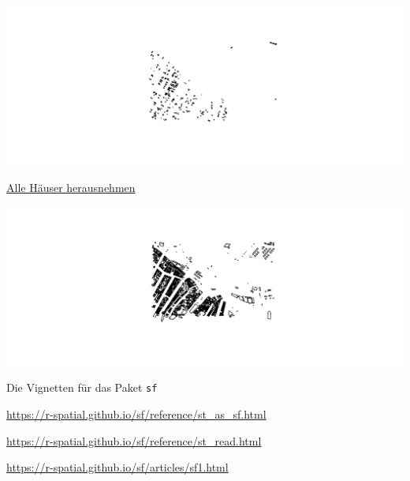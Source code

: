 \documentclass[ignorenonframetext,]{beamer}
\newenvironment{Shaded}{\begin{snugshade}}{\end{snugshade}}
\newcommand{\KeywordTok}[1]{\textcolor[rgb]{0.13,0.29,0.53}{\textbf{#1}}}
\newcommand{\NormalTok}[1]{#1}
\newcommand{\OperatorTok}[1]{\textcolor[rgb]{0.81,0.36,0.00}{\textbf{#1}}}
\newcommand{\StringTok}[1]{\textcolor[rgb]{0.31,0.60,0.02}{#1}}
\begin{document}
\begin{frame}[fragile]{}
\includegraphics{simplefeatures_files/figure-beamer/unnamed-chunk-25-1.pdf}

\end{frame}

\begin{frame}[fragile]{\href{https://cran.r-project.org/web/packages/sf/vignettes/sf4.html}{Alle
Häuser herausnehmen}}
\protect\hypertarget{alle-hauser-herausnehmen}{}

\begin{Shaded}
\end{Shaded}

\includegraphics{simplefeatures_files/figure-beamer/unnamed-chunk-26-1.pdf}

\end{frame}

\begin{frame}{Die Vignetten für das Paket \texttt{sf}}
\protect\hypertarget{die-vignetten-fur-das-paket-sf}{}

\url{https://r-spatial.github.io/sf/reference/st_as_sf.html}

\url{https://r-spatial.github.io/sf/reference/st_read.html}

\url{https://r-spatial.github.io/sf/articles/sf1.html}

\end{frame}
\end{document}
